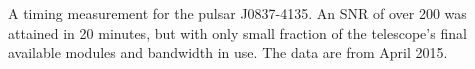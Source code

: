 A timing measurement for the pulsar J0837-4135. An SNR of over 200 was attained in 20 minutes, but with only small fraction of the telescope's final available modules and bandwidth in use. The data are from April 2015.    